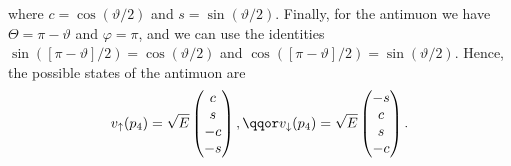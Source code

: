 \documentclass[fleqn]{NotesClass}
\begin{document}
    where \(c = \cos(\vartheta/2)\) and \(s = \sin(\vartheta/2)\).
    Finally, for the antimuon we have \(\Theta = \pi - \vartheta\) and \(\varphi = \pi\), and we can use the identities \(\sin([\pi - \vartheta]/2) = \cos(\vartheta/2)\) and \(\cos([\pi - \vartheta]/2) = \sin(\vartheta/2)\).
    Hence, the possible states of the antimuon are
    \begin{equation}
        v_{\uparrow}(p_4) = \sqrt{E}
        \begin{pmatrix}
            c\\ s\\ -c\\ -s
        \end{pmatrix}
        , \qqor v_{\downarrow}(p_4) = \sqrt{E}
        \begin{pmatrix}
            -s\\ c\\ s\\ -c
        \end{pmatrix}
        .
    \end{equation}
    
\end{document}
